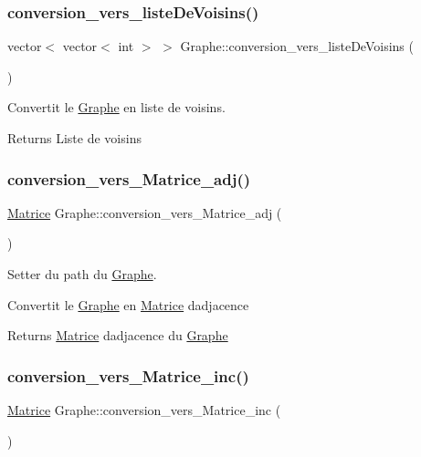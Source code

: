 \subsubsection{\texorpdfstring{conversion\+\_\+vers\+\_\+liste\+De\+Voisins()}{conversion\_vers\_listeDeVoisins()}}
{\footnotesize\ttfamily vector$<$ vector$<$ int $>$ $>$ Graphe\+::conversion\+\_\+vers\+\_\+liste\+De\+Voisins (\begin{DoxyParamCaption}{ }\end{DoxyParamCaption})}



Convertit le \hyperlink{classGraphe}{Graphe} en liste de voisins. 

\begin{DoxyReturn}{Returns}
Liste de voisins 
\end{DoxyReturn}
\mbox{\label{classGraphe_ae0ef7b4cd97f485e0b2fe5b207f9a74f}} 
\subsubsection{\texorpdfstring{conversion\+\_\+vers\+\_\+\+Matrice\+\_\+adj()}{conversion\_vers\_Matrice\_adj()}}
{\footnotesize\ttfamily \hyperlink{classMatrice}{Matrice} Graphe\+::conversion\+\_\+vers\+\_\+\+Matrice\+\_\+adj (\begin{DoxyParamCaption}{ }\end{DoxyParamCaption})}



Setter du path du \hyperlink{classGraphe}{Graphe}. 

Convertit le \hyperlink{classGraphe}{Graphe} en \hyperlink{classMatrice}{Matrice} d\textquotesingle{}adjacence \begin{DoxyReturn}{Returns}
\hyperlink{classMatrice}{Matrice} d\textquotesingle{}adjacence du \hyperlink{classGraphe}{Graphe} 
\end{DoxyReturn}
\mbox{\label{classGraphe_a34bc333a9a60b6f96725e2b5763a7006}} 
\subsubsection{\texorpdfstring{conversion\+\_\+vers\+\_\+\+Matrice\+\_\+inc()}{conversion\_vers\_Matrice\_inc()}}
{\footnotesize\ttfamily \hyperlink{classMatrice}{Matrice} Graphe\+::conversion\+\_\+vers\+\_\+\+Matrice\+\_\+inc (\begin{DoxyParamCaption}{ }\end{DoxyParamCaption})}



